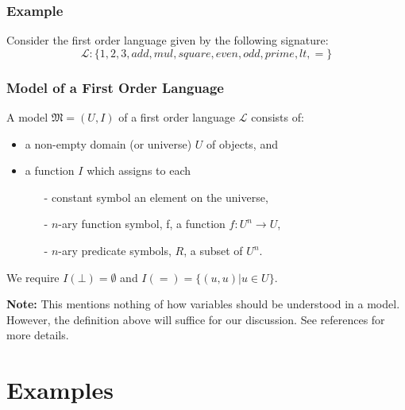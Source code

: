 \documentclass{beamer}
\theoremstyle{indentDefn} \newtheorem{defn}[]{Definition}
\begin{document}
\begin{frame}
	\frametitle{Example}
	
	Consider the first order language given by the following signature: 
	$$\mathcal{L}: \{1,2,3,add,mul,square,even,odd,prime,lt,=\}$$
	\vspace{5cm}
	
\end{frame}

\begin{frame}
	\frametitle{Model of a First Order Language}
	
	A model $\mathfrak{M} = (U,I)$ of a first order language $\mathcal{L}$ consists of: 
	
	\begin{itemize}
		\item a non-empty domain (or universe) $U$ of objects, and \vspace{0.2cm}
		\item a function $I$ which assigns to each \vspace{0.2cm}
			\begin{itemize}
				\item[-] constant symbol an element on the universe, \vspace{0.2cm}
				\item[-] $n$-ary function symbol, f, a function $f:U^{n} \rightarrow U$, \vspace{0.2cm}
				\item[-] $n$-ary predicate symbols, $R$, a subset of $U^{n}$. \vspace{0.2cm}
			\end{itemize}
	\end{itemize}
 
	We require $I(\bot) = \emptyset$ and $I(=) = \{(u,u) | u \in U\}$.
	
	\vspace{1cm}
	
	{\bf Note:} This mentions nothing of how variables should be understood in a model. However, the definition above will suffice for our discussion. See references for more details.
	
\end{frame}

\section{Examples}

\end{document}
